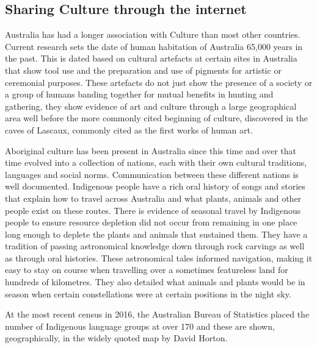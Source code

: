 \subsection{Sharing Culture through the internet}
Australia has had a longer association with Culture than most other countries. Current research sets the date of human habitation of Australia 65,000 years in the past\cite{RefWorks:426}. This is dated based on cultural artefacts at certain sites in Australia that show tool use and the preparation and use of pigments for artistic or ceremonial purposes. These artefacts do not just show the presence of a society or a group of humans banding together for mutual benefits in hunting and gathering, they show evidence of art and culture through a large geographical area well before the more commonly cited beginning of culture, discovered in the caves of Lascaux, commonly cited as the first works of human art. 

Aboriginal culture has been present in Australia since this time and over that time evolved into a collection of nations, each with their own cultural traditions, languages and social norms. Communication between these different nations is well documented. Indigenous people have a rich oral history of songs and stories that explain how to travel across Australia and what plants, animals and other people exist on these routes. There is evidence of seasonal travel by Indigenous people to ensure resource depletion did not occur from remaining in one place long enough to deplete the plants and animals that sustained them.\cite{RefWorks:453}\cite{RefWorks:454}  They have a tradition of passing astronomical knowledge down through rock carvings as well as through oral histories. These astronomical tales informed navigation, making it easy to stay on course when travelling over a sometimes featureless land for hundreds of kilometres. They also detailed what animals and plants would be in season when certain constellations were at certain positions in the night sky.\cite{norris_hamacher_2009} 

At the most recent census in 2016, the Australian Bureau of Statistics placed the number of Indigenous language groups at over 170 and these are shown, geographically, in the widely quoted map by David Horton. 

